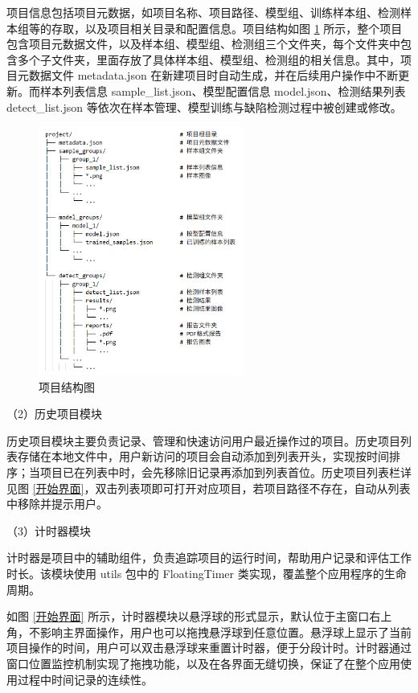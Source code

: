 \documentclass[
  ]{njuthesis}
\begin{document}
项目信息包括项目元数据，如项目名称、项目路径、模型组、训练样本组、检测样本组等的存取，以及项目相关目录和配置信息。项目结构如图 \ref{项目结构图} 所示，整个项目包含项目元数据文件，以及样本组、模型组、检测组三个文件夹，每个文件夹中包含多个子文件夹，里面存放了具体样本组、模型组、检测组的相关信息。其中，项目元数据文件 metadata.json 在新建项目时自动生成，并在后续用户操作中不断更新。而样本列表信息 sample\_list.json、模型配置信息 model.json、检测结果列表 detect\_list.json 等依次在样本管理、模型训练与缺陷检测过程中被创建或修改。

\begin{figure}[htb]
    \centering
    \includegraphics[width=0.6\textwidth]{images/项目结构图.png}
    \caption{项目结构图}
    \label{项目结构图}
\end{figure}

（2）历史项目模块

历史项目模块主要负责记录、管理和快速访问用户最近操作过的项目。历史项目列表存储在本地文件中，用户新访问的项目会自动添加到列表开头，实现按时间排序；当项目已在列表中时，会先移除旧记录再添加到列表首位。历史项目列表栏详见图 \ref{开始界面}，双击列表项即可打开对应项目，若项目路径不存在，自动从列表中移除并提示用户。

（3）计时器模块

计时器是项目中的辅助组件，负责追踪项目的运行时间，帮助用户记录和评估工作时长。该模块使用 utils 包中的 FloatingTimer 类实现，覆盖整个应用程序的生命周期。

如图 \ref{开始界面} 所示，计时器模块以悬浮球的形式显示，默认位于主窗口右上角，不影响主界面操作，用户也可以拖拽悬浮球到任意位置。悬浮球上显示了当前项目操作的时间，用户可以双击悬浮球来重置计时器，便于分段计时。计时器通过窗口位置监控机制实现了拖拽功能，以及在各界面无缝切换，保证了在整个应用使用过程中时间记录的连续性。
\end{document}
